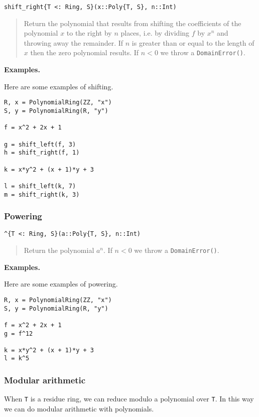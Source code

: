 \documentclass[a4paper,10pt]{article}
\newcommand{\code}{\lstinline}
\newcommand{\desc}[1]{\vspace{-3mm}\begin{quote}#1\end{quote}}
\begin{document}
{{{\begin{lstlisting}
shift_right{T <: Ring, S}(x::Poly{T, S}, n::Int)
\end{lstlisting}

\desc{Return the polynomial that results from shifting the coefficients of the
polynomial $x$ to the right by $n$ places, i.e. by dividing $f$ by $x^n$ and
throwing away the remainder. If $n$ is greater than or equal to the length of
$x$ then the zero polynomial results. If $n < 0$ we throw a 
\code{DomainError()}.}

\textbf{Examples.}

Here are some examples of shifting.

\begin{lstlisting}
R, x = PolynomialRing(ZZ, "x")
S, y = PolynomialRing(R, "y")

f = x^2 + 2x + 1

g = shift_left(f, 3)
h = shift_right(f, 1)

k = x*y^2 + (x + 1)*y + 3

l = shift_left(k, 7)
m = shift_right(k, 3)
\end{lstlisting}

\subsubsection{Powering}

\begin{lstlisting}
^{T <: Ring, S}(a::Poly{T, S}, n::Int)
\end{lstlisting}

\desc{Return the polynomial $a^n$. If $n < 0$ we throw a \code{DomainError()}.}

\textbf{Examples.}

Here are some examples of powering.

\begin{lstlisting}
R, x = PolynomialRing(ZZ, "x")
S, y = PolynomialRing(R, "y")

f = x^2 + 2x + 1
g = f^12

k = x*y^2 + (x + 1)*y + 3
l = k^5
\end{lstlisting}

\subsubsection{Modular arithmetic}

When \code{T} is a residue ring, we can reduce modulo a polynomial over
\code{T}. In this way we can do modular arithmetic with polynomials.

}}}
\end{document}
